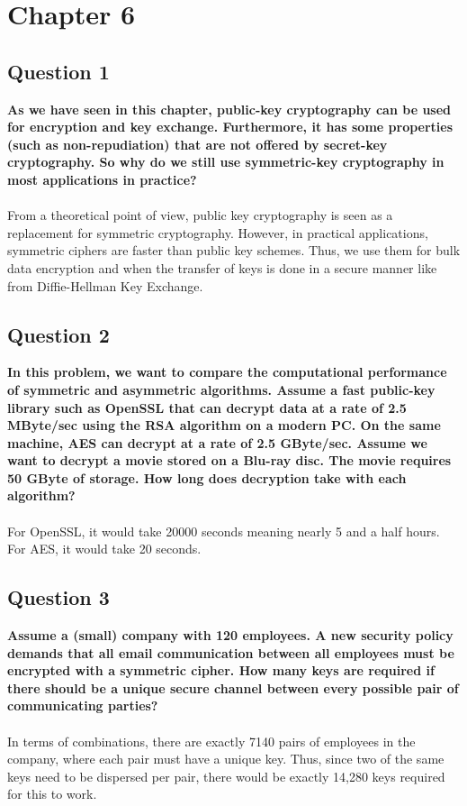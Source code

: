 \documentclass[titlepage]{article}
\begin{document}
\section{Chapter 6}
{
\subsection{Question 1}
{
\textbf{As we have seen in this chapter, public-key cryptography can be used for encryption and key exchange. Furthermore, it has some properties (such as non-repudiation) that are not offered by secret-key cryptography. So why do we still use symmetric-key cryptography in most applications in practice?}\\\\
From a theoretical point of view, public key cryptography is seen as a replacement for symmetric cryptography. However, in practical applications, symmetric ciphers are faster than public key schemes. Thus, we use them for bulk data encryption and when the transfer of keys is done in a secure manner like from Diffie-Hellman Key Exchange.
}
\subsection{Question 2}
{
\textbf{In this problem, we want to compare the computational performance of symmetric and asymmetric algorithms. Assume a fast public-key library such as OpenSSL that can decrypt data at a rate of 2.5 MByte/sec using the RSA algorithm on a modern PC. On the same machine, AES can decrypt at a rate of 2.5 GByte/sec. Assume we want to decrypt a movie stored on a Blu-ray disc. The movie requires 50 GByte of storage. How long does decryption take with each algorithm?}\\\\
For OpenSSL, it would take 20000 seconds meaning nearly 5 and a half hours. For AES, it would take 20 seconds.
}
\subsection{Question 3}
{
\textbf{Assume a (small) company with 120 employees. A new security policy demands that all email communication between all employees must be encrypted with a symmetric cipher. How many keys are required if there should be a unique secure channel between every possible pair of communicating parties?}\\\\
In terms of combinations, there are exactly 7140 pairs of employees in the company, where each pair must have a unique key. Thus, since two of the same keys need to be dispersed per pair, there would be exactly 14,280 keys required for this to work.
}
\clearpage
}
\end{document}
